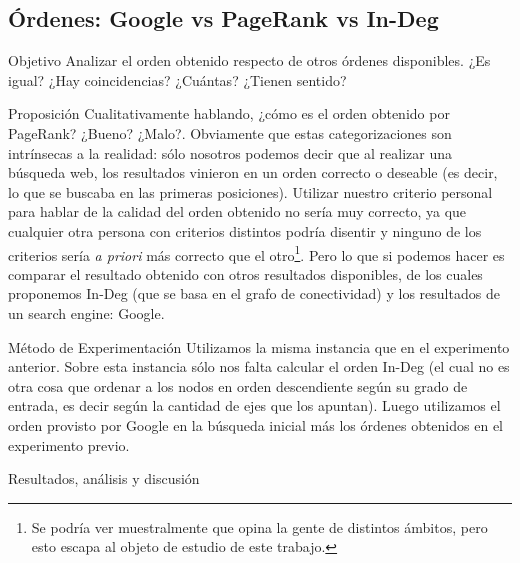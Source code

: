 \subsection{\'Ordenes: Google vs PageRank vs In-Deg}
\label{subsec:exp2}
\begin{LaTeXdescription}
    \item[Objetivo] Analizar el orden obtenido respecto de otros \'ordenes
        disponibles. ¿Es igual? ¿Hay coincidencias? ¿Cu\'antas? ¿Tienen sentido?

    \item[Proposici\'on] Cualitativamente hablando, ¿c\'omo es el orden obtenido
        por PageRank? ¿Bueno? ¿Malo?. Obviamente que estas categorizaciones son
        intr\'insecas a la realidad: s\'olo nosotros podemos decir que al
        realizar una b\'usqueda web, los resultados vinieron en un orden
        correcto o deseable (es decir, lo que se buscaba en las primeras
        posiciones).  Utilizar nuestro criterio personal para hablar de la
        calidad del orden obtenido no ser\'ia muy correcto, ya que cualquier
        otra persona con criterios distintos podr\'ia disentir y ninguno de los
        criterios ser\'ia \textit{a priori} m\'as correcto que el
        otro\footnote{Se podr\'ia ver muestralmente que opina la gente de
        distintos \'ambitos, pero esto escapa al objeto de estudio de este
        trabajo.}. Pero lo que si podemos hacer es comparar el resultado
        obtenido con otros resultados disponibles, de los cuales proponemos
        In-Deg (que se basa en el grafo de conectividad) y los resultados de un
        search engine: Google.

    \item[M\'etodo de Experimentaci\'on] Utilizamos la misma instancia que en el
        experimento anterior. Sobre esta instancia s\'olo nos falta calcular el
        orden In-Deg (el cual no es otra cosa que ordenar a los nodos en orden
        descendiente seg\'un su grado de entrada, es decir seg\'un la cantidad
        de ejes que los apuntan). Luego utilizamos el orden provisto por Google
        en la b\'usqueda inicial m\'as los \'ordenes obtenidos en el experimento
        previo.

    \item[Resultados, an\'alisis y discusi\'on]
\end{LaTeXdescription}

